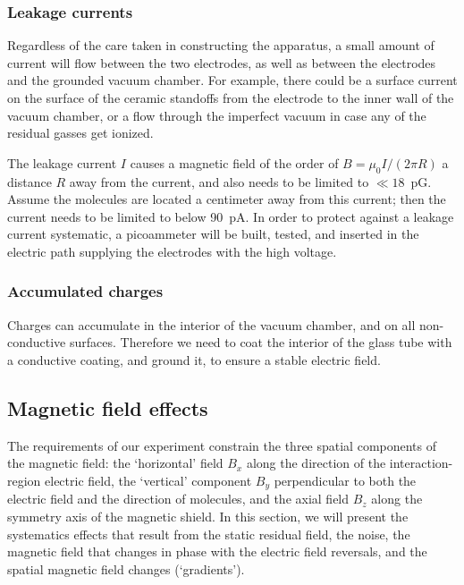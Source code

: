 \subsubsection{Leakage currents}
\label{systematics:leakage_current}

Regardless of the care taken in constructing the apparatus, a small amount of
current will flow between the two electrodes, as well as between the electrodes
and the grounded vacuum chamber. For example, there could be a surface current
on the surface of the ceramic standoffs from the electrode to the inner wall of
the vacuum chamber, or a flow through the imperfect vacuum in case any of the
residual gasses get ionized.

The leakage current $I$ causes a magnetic field of the order of $B=\mu_0I/(2\pi
R)$ a distance $R$ away from the current, and also needs to be limited to
$\ll18$~pG. Assume the molecules are located a centimeter away from this
current; then the current needs to be limited to below 90~pA. In order to
protect against a leakage current systematic, a picoammeter will be built,
tested, and inserted in the electric path supplying the electrodes with the high
voltage.

\subsubsection{Accumulated charges}

Charges can accumulate in the interior of the vacuum chamber, and on all
non-conductive surfaces. Therefore we need to coat the interior of the glass
tube with a conductive coating, and ground it, to ensure a stable electric
field.

\subsection{Magnetic field effects}
\label{systematics:magnetic}

The requirements of our experiment constrain the three spatial components of the
magnetic field: the `horizontal' field $B_x$ along the direction of the
interaction-region electric field, the `vertical' component $B_y$ perpendicular
to both the electric field and the direction of molecules, and the axial field
$B_z$ along the symmetry axis of the magnetic shield. In this section, we will
present the systematics effects that result from the static residual field, the
noise, the magnetic field that changes in phase with the electric field
reversals, and the spatial magnetic field changes (`gradients').

